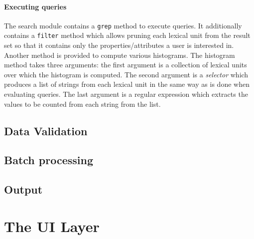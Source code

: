 \documentclass[10pt, a4paper, twocolumn]{article} %
\newcommand{\py}[1]{{\tt #1}}
\begin{document}
\paragraph{Executing queries}
The search module contains a \py{grep} method to execute queries. It additionally contains a \py{filter}
method which allows pruning each lexical unit from the result set so that it contains only the properties/attributes a user is interested in. Another method is provided to compute various histograms.
The histogram method takes three arguments: the first argument is a collection of lexical units over which the histogram is computed. The second argument is a \emph{selector} which produces a list of strings
from each lexical unit in the same way as is done when evaluating queries. The last argument is a
regular expression which extracts the values to be counted from each string from the list.




\subsection{Data Validation}
\subsection{Batch processing}
\subsection{Output}


\section{The UI Layer}
\end{document}
